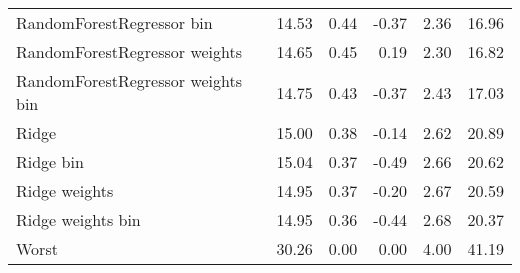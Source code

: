 \documentclass[]{article}
\begin{document}
\begin{table}
{\begin{tabular}{lrrrrr}
RandomForestRegressor bin         &     14.53 &  0.44 &  -0.37 & 2.36 &       16.96 \\
RandomForestRegressor weights     &     14.65 &  0.45 &   0.19 & 2.30 &       16.82 \\
RandomForestRegressor weights bin &     14.75 &  0.43 &  -0.37 & 2.43 &       17.03 \\
Ridge                             &     15.00 &  0.38 &  -0.14 & 2.62 &       20.89 \\
Ridge bin                         &     15.04 &  0.37 &  -0.49 & 2.66 &       20.62 \\
Ridge weights                     &     14.95 &  0.37 &  -0.20 & 2.67 &       20.59 \\
Ridge weights bin                 &     14.95 &  0.36 &  -0.44 & 2.68 &       20.37 \\
Worst                             &     30.26 &  0.00 &   0.00 & 4.00 &       41.19 \\
\bottomrule
\end{tabular}
 }
\end{table}
\end{document}
